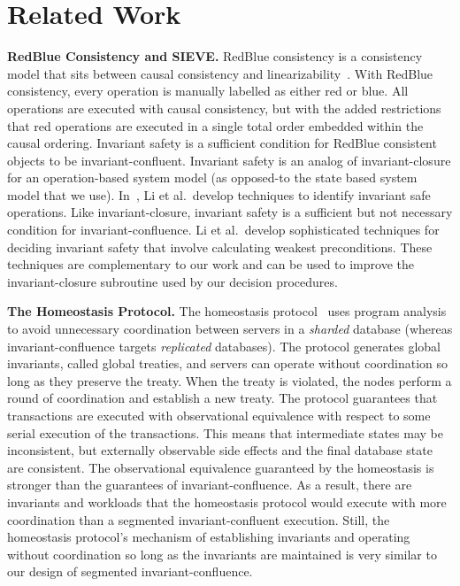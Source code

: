 \section{Related Work}

\newcommand{\sieve}{\textsc{SIEVE}}
\textbf{RedBlue Consistency and \sieve.}
RedBlue consistency is a consistency model that sits between causal consistency
and linearizability~\cite{li2012making}.
%
With RedBlue consistency, every operation is manually labelled as either red or
blue. All operations are executed with causal consistency, but with the added
restrictions that red operations are executed in a single total order embedded
within the causal ordering.
%
Invariant safety is a sufficient condition for RedBlue consistent objects to be
invariant-confluent. Invariant safety is an analog of invariant-closure for an
operation-based system model (as opposed-to the state based system model that
we use). In~\cite{li2014automating}, Li et al.\ develop techniques to identify
invariant safe operations. Like invariant-closure, invariant safety is a
sufficient but not necessary condition for invariant-confluence. Li et al.\
develop sophisticated techniques for deciding invariant safety that involve
calculating weakest preconditions. These techniques are complementary to our
work and can be used to improve the invariant-closure subroutine used by our
decision procedures.

\textbf{The Homeostasis Protocol.}
The homeostasis protocol~\cite{roy2015homeostasis} uses program analysis to
avoid unnecessary coordination between servers in a \emph{sharded} database
(whereas invariant-confluence targets \emph{replicated} databases). The
protocol generates global invariants, called global treaties, and servers can
operate without coordination so long as they preserve the treaty. When the
treaty is violated, the nodes perform a round of coordination and establish a
new treaty. The protocol guarantees that transactions are executed with
observational equivalence with respect to some serial execution of the
transactions. This means that intermediate states may be inconsistent, but
externally observable side effects and the final database state are consistent.
The observational equivalence guaranteed by the homeostasis is stronger than
the guarantees of invariant-confluence. As a result, there are invariants and
workloads that the homeostasis protocol would execute with more coordination
than a segmented invariant-confluent execution. Still, the homeostasis
protocol's mechanism of establishing invariants and operating without
coordination so long as the invariants are maintained is very similar to our
design of segmented invariant-confluence.

